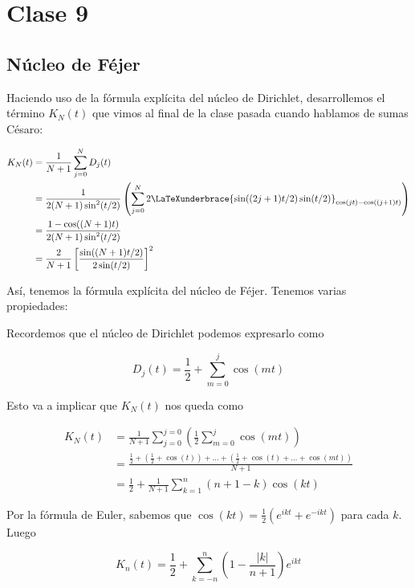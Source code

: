 \section{Clase 9}
\subsection{Núcleo de Féjer}

Haciendo uso de la fórmula explícita del núcleo de Dirichlet, desarrollemos el término $K_N(t)$ que vimos al final de la clase pasada cuando hablamos de sumas Césaro:

\begin{equation*}
    \begin{aligned}
        K_N(t) &= \frac{1}{N+1} \sum_{j=0}^{N} D_j(t) \\
        &= \frac{1}{2(N+1)\sin^2(t/2)} \left( \sum_{j=0}^{N} 2\LaTeXunderbrace{\sin( (2j + 1)t/2 ) \sin(t/2)}_{\cos(jt)-\cos((j+1)t)} \right) \\
        &= \frac{1 - \cos((N+1)t)}{2(N+1)\sin^2(t/2)} \\
        &= \frac{2}{N+1}  \left[ \frac{\sin((N+1)t/2)}{2\sin(t/2)} \right]^2
    \end{aligned}
\end{equation*}

Así, tenemos la fórmula explícita del núcleo de Féjer. Tenemos varias propiedades:

\begin{aco}
    Recordemos que el núcleo de Dirichlet podemos expresarlo como

    \[
        D_j(t) = \frac{1}{2} + \sum_{m=0}^{j} \cos(mt)
    \]

    Esto va a implicar que $K_N(t)$ nos queda como

    \begin{equation*}
        \begin{aligned}
            K_N(t) &= \frac{1}{N+1} \sum_{j=0}^{j=0} \left( \frac{1}{2} \sum_{m=0}^{j} \cos(mt) \right) \\
            &= \frac{\frac{1}{2} + \left(\frac{1}{2} + \cos(t)\right) + \dots + \left(\frac{1}{2} + \cos(t) + \dots + \cos(mt)\right)}{N+1} \\
            &= \frac{1}{2} + \frac{1}{N+1} \sum_{k=1}^{n} (n+1-k)\cos(kt)
        \end{aligned}
    \end{equation*}

    Por la fórmula de Euler, sabemos que $\cos(kt) = \frac{1}{2} (e^{ikt} + e^{-ikt})$ para cada $k$. Luego

    \[
        K_n(t) = \frac{1}{2} + \sum_{k=-n}^{n} \left( 1 - \frac{|k|}{n+1} \right)e^{ikt}
    \]
\end{aco}

